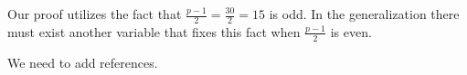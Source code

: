 \documentclass[12pt]{article}
\begin{document}
Our proof utilizes the fact that $\frac{p-1}{2} = \frac{30}{2}=15$ is odd. In the generalization there must exist another variable that fixes this fact when $\frac{p-1}{2}$ is even.


\begin{thebibliography}{}

We need to add references.

\end{thebibliography}
\end{document}
